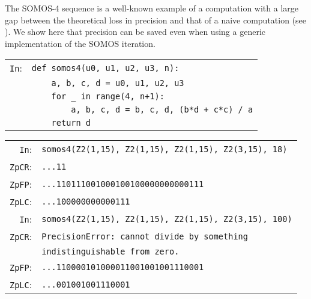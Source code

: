\documentclass[sigconf]{acmart}
\newcommand{\cIn}{{\color{blue} \tt \phantom{Zp}In}:}
\newcommand{\cZpCR}{{\color{red} \tt ZpCR}:}
\newcommand{\cZpFP}{{\color{red} \tt ZpFP}:}
\newcommand{\cZpLC}{{\color{red} \tt ZpLC}:}
\theoremstyle{definition}
\begin{document}
The SOMOS-4 sequence is a well-known example
of a computation with a large gap between
the theoretical loss in precision
and that of a naive computation (see \cite{caruso-roe-vaccon:14a}).
We show here that precision can be saved
even when using a generic implementation
of the SOMOS iteration.


\begin{tabular}{rl}
\cIn
 & \verb?def somos4(u0, u1, u2, u3, n):? \\
 & \verb?    a, b, c, d = u0, u1, u2, u3? \\
 & \verb?    for _ in range(4, n+1):? \\
 & \verb?        a, b, c, d = b, c, d, (b*d + c*c) / a? \\
 & \verb?    return d? \\
\end{tabular}
\begin{tabular}{rl}
\cIn
 & \verb?somos4(Z2(1,15), Z2(1,15), Z2(1,15), Z2(3,15), 18)? \\
\cZpCR
 & \verb?...11? \\
\cZpFP
 & \verb?...110111001000100100000000000111? \\
\cZpLC
 & \verb?...100000000000111? \\
\cIn
 & \verb?somos4(Z2(1,15), Z2(1,15), Z2(1,15), Z2(3,15), 100)? \\
\cZpCR
 & \verb?PrecisionError: cannot divide by something?\\
 &\verb?indistinguishable from zero.? \\
\cZpFP
 & \verb?...110000101000011001001001110001? \\
\cZpLC
 & \verb?...001001001110001? \\
\end{tabular}
%
\end{document}
